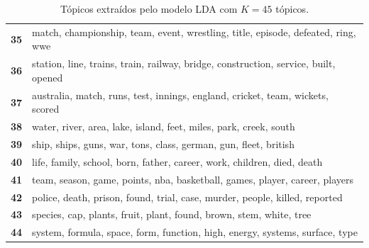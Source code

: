 \begin{table}[htpb]
\begin{tabularx}{\textwidth}{@{}l X@{}}
        \textbf{35} & match, championship, team, event, wrestling, title, episode, defeated, ring, wwe \\
        \textbf{36} & station, line, trains, train, railway, bridge, construction, service, built, opened \\
        \textbf{37} & australia, match, runs, test, innings, england, cricket, team, wickets, scored \\
        \textbf{38} & water, river, area, lake, island, feet, miles, park, creek, south \\
        \textbf{39} & ship, ships, guns, war, tons, class, german, gun, fleet, british \\
        \textbf{40} & life, family, school, born, father, career, work, children, died, death \\
        \textbf{41} & team, season, game, points, nba, basketball, games, player, career, players \\
        \textbf{42} & police, death, prison, found, trial, case, murder, people, killed, reported \\
        \textbf{43} & species, cap, plants, fruit, plant, found, brown, stem, white, tree \\
        \textbf{44} & system, formula, space, form, function, high, energy, systems, surface, type \\
        \bottomrule
    \end{tabularx}
    \caption{Tópicos extraídos pelo modelo LDA com $K=45$ tópicos.}
    \label{tab:topicos_lda_45}
\end{table}
